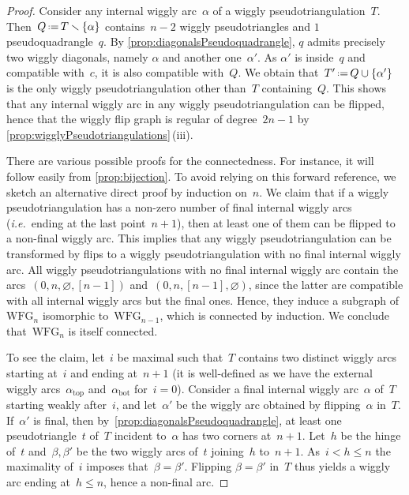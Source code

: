 \documentclass{amsart}
\theoremstyle{definition}
\newcommand{\ssm}{\smallsetminus} %
\newcommand{\eqdef}{\mbox{\,\raisebox{0.2ex}{\scriptsize\ensuremath{\mathrm:}}\ensuremath{=}\,}} %
\newcommand{\ie}{\textit{i.e.}~} %
\newcommand{\wigglyFlipGraph}{\mathrm{WFG}} %
\begin{document}
\begin{proof}
Consider any internal wiggly arc~$\alpha$ of a wiggly pseudotriangulation~$T$.
Then~${Q \eqdef T \ssm \{\alpha\}}$ contains~$n-2$ wiggly pseudotriangles and $1$ pseudoquadrangle~$q$.
By \cref{prop:diagonalsPseudoquadrangle}, $q$ admits precisely two wiggly diagonals, namely $\alpha$ and another one~$\alpha'$.
As $\alpha'$ is inside~$q$ and compatible with~$c$, it is also compatible with~$Q$.
We obtain that~$T' \eqdef Q \cup \{\alpha'\}$ is the only wiggly pseudotriangulation other than~$T$ containing~$Q$.
This shows that any internal wiggly arc in any wiggly pseudotriangulation can be flipped, hence that the wiggly flip graph is regular of degree~$2n-1$ by \cref{prop:wigglyPseudotriangulations}\,(iii).

There are various possible proofs for the connectedness.
For instance, it will follow easily from \cref{prop:bijection}.
To avoid relying on this forward reference, we sketch an alternative direct proof by induction on~$n$.
We claim that if a wiggly pseudotriangulation has a non-zero number of final internal wiggly arcs (\ie ending at the last point~$n+1$), then at least one of them can be flipped to a non-final wiggly arc.
This implies that any wiggly pseudotriangulation can be transformed by flips to a wiggly pseudotriangulation with no final internal wiggly arc.
All wiggly pseudotriangulations with no final internal wiggly arc contain the arcs~$(0,n,\varnothing,[n-1])$ and~$(0,n,[n-1],\varnothing)$, since the latter are compatible with all internal wiggly arcs but the final ones.
Hence, they induce a subgraph of~$\wigglyFlipGraph_n$ isomorphic to~$\wigglyFlipGraph_{n-1}$, which is connected by induction.
We conclude that~$\wigglyFlipGraph_n$ is itself connected.

To see the claim, let~$i$ be maximal such that~$T$ contains two distinct wiggly arcs starting at~$i$ and ending at~$n+1$ (it is well-defined as we have the external wiggly arcs~$\alpha_\mathrm{top}$ and~$\alpha_\mathrm{bot}$ for~$i = 0$).
Consider a final internal wiggly arc~$\alpha$ of~$T$ starting weakly after~$i$, and let~$\alpha'$ be the wiggly arc obtained by flipping~$\alpha$ in~$T$.
If~$\alpha'$ is final, then by~\cref{prop:diagonalsPseudoquadrangle}, at least one pseudotriangle~$t$ of~$T$ incident to~$\alpha$ has two corners at~$n+1$.
Let~$h$ be the hinge of~$t$ and~$\beta, \beta'$ be the two wiggly arcs of~$t$ joining~$h$ to~$n+1$.
As~$i < h \le n$ the maximality of~$i$ imposes that~$\beta = \beta'$.
Flipping $\beta = \beta'$ in~$T$ thus yields a wiggly arc ending at~$h \le n$, hence a non-final arc.
\end{proof}
\end{document}

